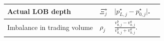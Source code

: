 \documentclass{rQUF2e}
\theoremstyle{plain}
\theoremstyle{definition}
\theoremstyle{remark}
\begin{document}
\begin{longtable}{|p{4cm}|p{2.25cm}|p{5.25cm}|p{2.25cm}|}

    Actual LOB depth                                                                                                                                                       &
    $\Xi^{\star}_j$                                                                                                                                                        &
    $\big| p^{\star}_{L, j} - p^{\star}_{0, j} \big|$.                                                                                                                     &
    \citep{briola2024deep}                                                                                                                                                                                                                                                                                                                                                                      \\ \hline

    Imbalance in trading volume                                                                                                                                            &
    $\rho_j$                                                                                                                                                               &
    $\frac{v^b_{0, j} - v^a_{0, j}}{v^b_{0, j} + v^a_{0, j}}$.                                                                                                             &
    \citep{cartea2018enhancing}                                                                                                                                                                                                                                                                                                                                                                 \\ \hline


\end{longtable}
\end{document}
